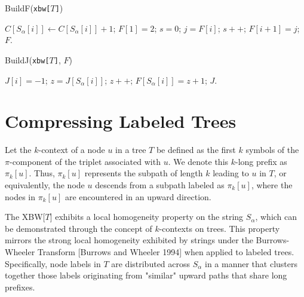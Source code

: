 \begin{algorithm}[H]
    \caption{BuildF(\texttt{xbw[$T$]})}
    \label{alg:buildF}
    \begin{algorithmic}[1]
        \State $C[S_\alpha[i]] \gets C[S_\alpha[i]] + 1$; 
    \EndFor
    \State $F[1] = 2$; 
     
        \State $s = 0$; $j = F[i]$;
         
             $s++$; 
            \EndIf
        \EndWhile
        \State $F[i+1] = j$;
    \EndFor
    \State \Return $F$.
    \end{algorithmic}
\end{algorithm}
    
\begin{algorithm}[H]
    \caption{BuildJ(\texttt{xbw[$T$]}, $F$)}
    \begin{algorithmic}[1]
            \State $J[i] = -1$; 
        \Else
            \State $z = J[S_\alpha[i]]$;
             $z++$; 
            \EndWhile
            \State $F[S_\alpha[i]] = z + 1$;
        \EndIf
    \EndFor
    \State \Return $J$.
    \end{algorithmic}
\end{algorithm}

\section{Compressing Labeled Trees}
Let the $k$-context of a node $u$ in a tree $T$ be defined as the first $k$ symbols of the $\pi$-component of the triplet associated with $u$. We denote this $k$-long prefix as $\pi_k[u]$. Thus, $\pi_k[u]$ represents the subpath of length $k$ leading to $u$ in $T$, or equivalently, the node $u$ descends from a subpath labeled as $\pi_k[u]$, where the nodes in $\pi_k[u]$ are encountered in an upward direction.

The XBW[$T$] exhibits a local homogeneity property on the string $S_{\alpha}$, which can be demonstrated through the concept of $k$-contexts on trees. This property mirrors the strong local homogeneity exhibited by strings under the Burrows-Wheeler Transform [Burrows and Wheeler 1994] when applied to labeled trees. Specifically, node labels in $T$ are distributed across $S_{\alpha}$ in a manner that clusters together those labels originating from "similar" upward paths that share long prefixes. 

